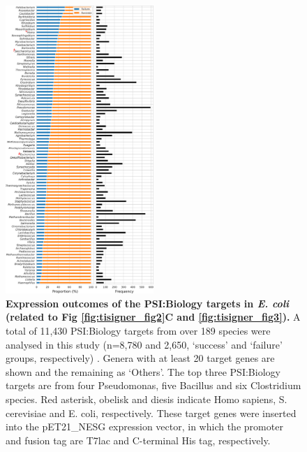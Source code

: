 \begin{figure}
	\includegraphics[width=0.5\textwidth]{appendix/TIsigner/Figs/S7.png}
	\caption[ Expression outcomes of the PSI:Biology targets in E. coli (related to Fig 2C and 3). ]{\textbf{ Expression outcomes of the PSI:Biology targets in \textit{E. coli} (related to Fig \ref{fig:tisigner_fig2}C and \ref{fig:tisigner_fig3}). } A total of 11,430 PSI:Biology targets from over 189 species were analysed in this study (n=8,780 and 2,650, ‘success’ and ‘failure’ groups, respectively) \cite{Chen2004-cp,Seiler2014-ox,Acton2005-ng}. Genera with at least 20 target genes are shown and the remaining as ‘Others’. The top three PSI:Biology targets are from four Pseudomonas, five Bacillus and six Clostridium species. Red asterisk, obelisk and diesis indicate Homo sapiens, S. cerevisiae and E. coli, respectively. These target genes were inserted into the pET21\_NESG expression vector, in which the promoter and fusion tag are T7lac and C-terminal His tag, respectively.}
	\label{fig:appendix_TIsigner_S7}
\end{figure}



